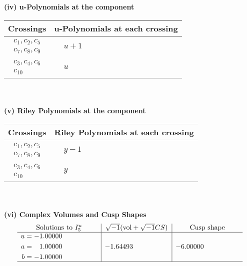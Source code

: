 \documentclass[1p]{elsarticle_modified}
\theoremstyle{definition}
\newcommand{\I}{\sqrt{-1}}
\begin{document}
\newpage\renewcommand{\arraystretch}{1}
\flushleft \textbf{(iv) u-Polynomials at the component}\newline \\
\begin{tabular}{m{50pt}|m{274pt}}
Crossings & \hspace{64pt}u-Polynomials at each crossing \\
\hline $$\begin{aligned}c_{1},c_{2},c_{5}\\c_{7},c_{8},c_{9}\end{aligned}$$&$\begin{aligned}
&u+1
\end{aligned}$\\
\hline $$\begin{aligned}c_{3},c_{4},c_{6}\\c_{10}\end{aligned}$$&$\begin{aligned}
&u
\end{aligned}$\\
\hline
\end{tabular}\\~\\
\newpage\renewcommand{\arraystretch}{1}
\flushleft \textbf{(v) Riley Polynomials at the component}\newline \\
\begin{tabular}{m{50pt}|m{274pt}}
Crossings & \hspace{64pt}Riley Polynomials at each crossing \\
\hline $$\begin{aligned}c_{1},c_{2},c_{5}\\c_{7},c_{8},c_{9}\end{aligned}$$&$\begin{aligned}
&y-1
\end{aligned}$\\
\hline $$\begin{aligned}c_{3},c_{4},c_{6}\\c_{10}\end{aligned}$$&$\begin{aligned}
&y
\end{aligned}$\\
\hline
\end{tabular}\\~\\
\newpage\flushleft \textbf{(vi) Complex Volumes and Cusp Shapes}
$$\begin{array}{c|c|c}  
\text{Solutions to }I^u_{5}& \I (\text{vol} + \sqrt{-1}CS) & \text{Cusp shape}\\
 \hline 
\begin{aligned}
u &= -1.00000\phantom{ +0.000000I} \\
a &= \phantom{-}1.00000\phantom{ +0.000000I} \\
b &= -1.00000\phantom{ +0.000000I}\end{aligned}
 & -1.64493\phantom{ +0.000000I} & -6.00000\phantom{ +0.000000I}\\
 \hline 
 \end{array}$$\newpage
\end{document}
